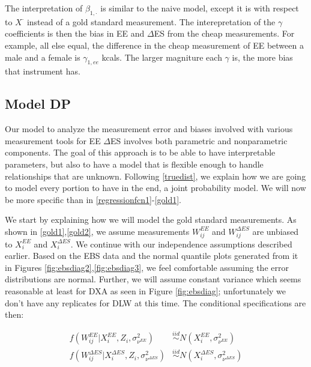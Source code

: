 \documentclass[11pt]{article}\usepackage[]{graphicx}\usepackage[]{color}
\begin{document}
The interpretation of $\beta_{1,\cdot}$ is similar to the naive model, except it is with respect to $X^{\cdot}$ instead of a gold standard measurement.  The interepretation of the $\gamma$ coefficients is then the bias in EE and $\Delta$ES from the cheap measurements. For example, all else equal, the difference in the cheap measurement of EE between a male and a female is $\gamma_{1,ee}$ kcals. The larger magniture each $\gamma$ is, the more bias that  instrument has. 




\subsection{Model DP}

Our model to analyze the measurement error and biases involved with various measurement tools for EE $\Delta$ES involves both parametric and nonparametric components. The goal of this approach is to be able to have interpretable parameters, but also to have a model that is flexible enough to handle relationships  that are unknown. Following \eqref{truedist}, we explain how we are going to model every portion to have in the end, a joint probability model. We will now be more specific than in \eqref{regressionfcn1}-\eqref{gold1}.

We start by explaining how we will model the gold standard measurements. As shown in \eqref{gold1},\eqref{gold2}, we assume measurements $W_{ij}^{EE}$ and $W_{ij}^{\Delta ES}$ are unbiased to $X_i^{EE}$ and $X_i^{\Delta ES}$. We continue with our independence assumptions described earlier. Based on the EBS data and the normal quantile plots generated from it in Figures \eqref{fig:ebsdiag2},\eqref{fig:ebsdiag3}, we feel comfortable assuming the error distributions are normal. Further, we will assume constant variance which seems reasonable at least for DXA as seen in Figure \eqref{fig:ebsdiag}; unfortunately we don't have any replicates for DLW at this time. The conditional specifications are then:

\begin{align}
  f(W_{ij}^{EE}|X_i^{EE},Z_i,\sigma_{\nu^{EE}}^2) &\overset{iid}{\sim} N(X_i^{EE},\sigma_{\nu^{EE}}^2) \\
    f(W_{ij}^{\Delta ES}|X_i^{\Delta ES},Z_i,\sigma_{\nu^{\Delta ES}}^2) &\overset{iid}{\sim} N(X_i^{\Delta ES},\sigma_{\nu^{\Delta ES}}^2) \\
\end{align}
\end{document}
